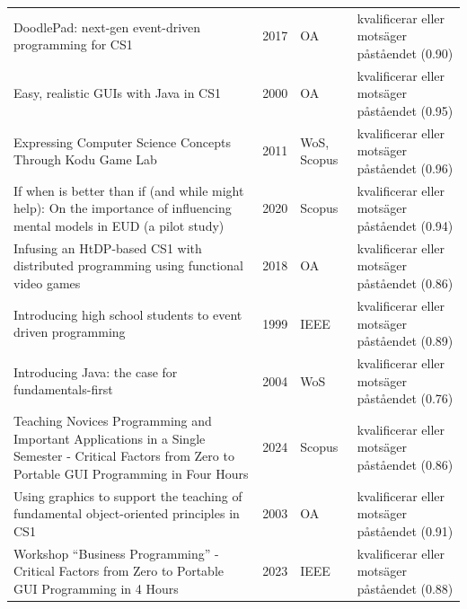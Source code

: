 \begin{longtable}{@{}%
  >{\raggedright\arraybackslash}p{}c%
  >{\raggedright\arraybackslash}p{}%
  >{\raggedright\arraybackslash}p{}@{}}
DoodlePad: next-gen event-driven programming for CS1 & 2017 & OA & kvalificerar eller motsäger påståendet (0.90) \\
Easy, realistic GUIs with Java in CS1 & 2000 & OA & kvalificerar eller motsäger påståendet (0.95) \\
Expressing Computer Science Concepts Through Kodu Game Lab & 2011 & WoS, Scopus & kvalificerar eller motsäger påståendet (0.96) \\
If when is better than if (and while might help): On the importance of influencing mental models in EUD (a pilot study) & 2020 & Scopus & kvalificerar eller motsäger påståendet (0.94) \\
Infusing an HtDP-based CS1 with distributed programming using functional video games & 2018 & OA & kvalificerar eller motsäger påståendet (0.86) \\
Introducing high school students to event driven programming & 1999 & IEEE & kvalificerar eller motsäger påståendet (0.89) \\
Introducing Java: the case for fundamentals-first & 2004 & WoS & kvalificerar eller motsäger påståendet (0.76) \\
Teaching Novices Programming and Important Applications in a Single Semester - Critical Factors from Zero to Portable GUI Programming in Four Hours & 2024 & Scopus & kvalificerar eller motsäger påståendet (0.86) \\
Using graphics to support the teaching of fundamental object-oriented principles in CS1 & 2003 & OA & kvalificerar eller motsäger påståendet (0.91) \\
Workshop \enquote{Business Programming} - Critical Factors from Zero to Portable GUI Programming in 4 Hours & 2023 & IEEE & kvalificerar eller motsäger påståendet (0.88) \\
\end{longtable}
\endgroup
